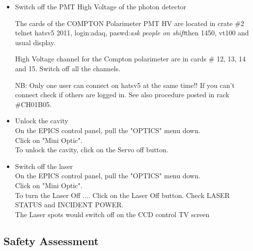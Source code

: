 {\begin{itemize}
To make sure the detector is where you want watch the detector move on the TV screen (there is one 
in tha Hall A counting house and one in the back room). The switches readback must oscillate a 
little bit if the system is running properly.

\item  Switch off the PMT High Voltage of the photon detector\\
\par The cards of the COMPTON Polarimeter PMT HV are located in crate \#2
telnet hatsv5 2011, login:adaq, paswd:{\it ask people on shift}then 1450, vt100 and usual display.
\par High Voltage channel for the Compton polarimeter are in cards \# 12, 13, 14 and 15.
Switch off all the channels.
\par NB: Only one user can connect on hatsv5 at the same time!! If you can't connect 
check if others are logged in. See also procedure posted in rack \#CH01B05.

\item Unlock the cavity\\
On the EPICS control panel, pull the "OPTICS" menu down. \\
Click on "Mini Optic".\\
To unlock the cavity, click on the Servo off button.\\
\item Switch off the laser\\
On the EPICS control panel, pull the "OPTICS" menu down.\\
 Click on "Mini Optic".\\
 To turn the Laser Off .... Click on the Laser Off button.
 Check LASER STATUS and INCIDENT POWER.\\
 The Laser spots would switch off on the CCD control TV screen
\end {itemize}
} %

\begin{safetyen}{0}{0}
\section {Safety Assessment}
\label{sec:compton_safety}
\end{safetyen}

